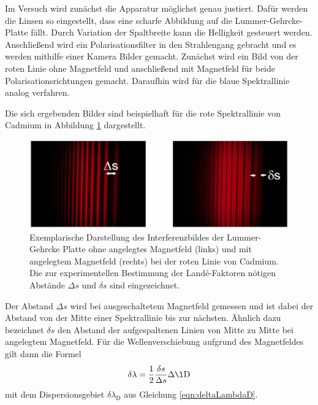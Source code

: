Im Versuch wird zunächst die Apparatur möglichst genau justiert. Dafür werden
die Linsen so eingestellt, dass eine scharfe Abbildung auf die Lummer-Gehrcke-Platte
fällt. Durch Variation der Spaltbreite kann die Helligkeit gesteuert werden.
Anschließend wird ein Polarisationsfilter in den Strahlengang gebracht und es werden
mithilfe einer Kamera Bilder gemacht. Zunächst wird ein Bild von der roten Linie ohne
Magnetfeld und anschließend mit Magnetfeld für beide Polarisationsrichtungen gemacht.
Daraufhin wird für die blaue Spektrallinie analog verfahren.

Die sich ergebenden Bilder sind beispielhaft für die rote Spektrallinie von Cadmium in Abbildung \ref{fig:abstaende} dargestellt.

\begin{figure}
  \centering
  \includegraphics[width=\textwidth]{data/abstaende.png}
  \caption{Exemplarische Darstellung des Interferenzbildes der Lummer-Gehrcke Platte ohne angelegtes Magnetfeld (links) und mit angelegtem Magnetfeld (rechts) bei der roten Linie von Cadmium. Die zur experimentellen Bestimmung der Landé-Faktoren nötigen Abstände $\Delta s$ und $\delta s$ sind eingezeichnet. \cite{Versuchsanleitung}}
  \label{fig:abstaende}
\end{figure}

Der Abstand $\Delta s$ wird bei ausgeschaltetem Magnetfeld gemessen und ist dabei der Abstand von der Mitte einer Spektrallinie bis zur nächsten. Ähnlich dazu bezeichnet $\delta s$ den Abstand der aufgespaltenen Linien von Mitte zu Mitte bei angelegtem Magnetfeld.
Für die Wellenverschiebung aufgrund des Magnetfeldes gilt dann die Formel
\begin{equation}
  \delta \lambda = \frac{1}{2} \frac{\delta s}{\Delta s} \Delta \l\text{D}
  \label{eqn:deltaLambda}
\end{equation}
mit dem Dispersionsgebiet $\delta \lambda_\text{D}$ aus Gleichung \eqref{eqn:deltaLambdaD}.
